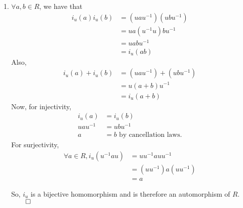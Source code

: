 \documentclass[12pt]{report}
\begin{document}
\sol \begin{enumerate}[label=\alph*.]
    \item $\forall a,b \in R$, we have that 
    \begin{align*}
        i_u(a)i_u(b) &= (uau^{-1})(ubu^{-1}) \\
        &= ua(u^{-1}u)bu^{-1} \\
        &= uabu^{-1} \\
        &= i_u(ab)
    \end{align*}
    Also,
    \begin{align*}
        i_u(a) + i_u(b) &= (uau^{-1}) + (ubu^{-1}) \\
        &= u(a + b)u^{-1} \\
        &= i_u(a + b)
    \end{align*}
    Now, for injectivity,
    \begin{align*}
        i_u(a) &= i_u(b) \\
        uau^{-1} &= ubu^{-1} \\
        a &= b \text{ by cancellation laws.}
    \end{align*}
    For surjectivity,
    \begin{align*}
        \forall a \in R, i_u(u^{-1}au) &= uu^{-1}auu^{-1}\\
        &= (uu^{-1})a(uu^{-1})\\
        &= a
    \end{align*}

    So, $i_u$ is a bijective homomorphism and is therefore an automorphism of $R$. $\qed$


\end{enumerate}
\end{document}
